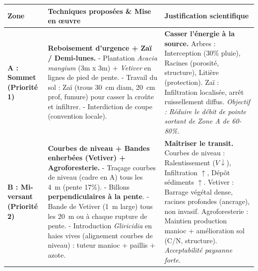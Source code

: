 \documentclass[11pt]{article}
\begin{document}
\begin{exoresolu}
\begin{center}
\begin{tabularx}{\linewidth}{|l|X|l|}\hline
\textbf{Zone} & \textbf{Techniques proposées \& Mise en œuvre} & \textbf{Justification scientifique} \\ \hline
\textbf{A : Sommet (Priorité 1)} & \textbf{Reboisement d'urgence + Zaï / Demi-lunes.} \newline - Plantation \emph{Acacia mangium} (3m x 3m) + \emph{Vetiver} en lignes de pied de pente. \newline - Travail du sol : Zaï (trous \SI{30}{cm} diam, \SI{20}{cm} prof, fumure) pour casser la croûte et infiltrer. \newline - Interdiction de coupe (convention locale). & \textbf{Casser l'énergie à la source.} \newline Arbres : Interception (30\% pluie), Racines (porosité, structure), Litière (protection). \newline Zaï : Infiltration localisée, arrêt ruissellement diffus. \newline \textit{Objectif : Réduire le débit de pointe sortant de Zone A de 60-80\%.} \\ \hline
\textbf{B : Mi-versant (Priorité 2)} & \textbf{Courbes de niveau + Bandes enherbées (Vetiver) + Agroforesterie.} \newline - Traçage courbes de niveau (cadre en A) tous les \SI{4}{m} (pente 17\%). \newline - Billons \textbf{perpendiculaires à la pente}. \newline - Bande de Vetiver (\SI{1}{m} large) tous les \SI{20}{m} ou à chaque rupture de pente. \newline - Introduction \emph{Gliricidia} en haies vives (alignement courbes de niveau) : tuteur manioc + paillis + azote. & \textbf{Maîtriser le transit.} \newline Courbes de niveau : Ralentissement ($V \downarrow$), Infiltration $\uparrow$, Dépôt sédiments $\uparrow$. \newline Vetiver : Barrage végétal dense, racines profondes (ancrage), non invasif. \newline Agroforesterie : Maintien production manioc + amélioration sol (C/N, structure). \textit{Acceptabilité paysanne forte.} \\ \hline

\end{tabularx}
\end{center}
\end{exoresolu}
\end{document}
